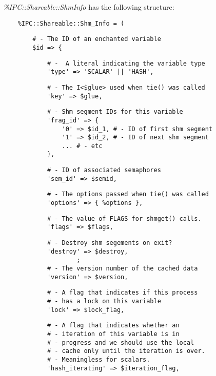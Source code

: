 {\em \%IPC::Shareable::Shm\underscore{}Info\/} has the following structure:
\begin{verbatim}
    %IPC::Shareable::Shm_Info = (
\end{verbatim}
\begin{verbatim}
        # - The ID of an enchanted variable
        $id => {
\end{verbatim}
\begin{verbatim}
            # -  A literal indicating the variable type
            'type' => 'SCALAR' || 'HASH',
\end{verbatim}
\begin{verbatim}
            # - The I<$glue> used when tie() was called
            'key' => $glue,
\end{verbatim}
\begin{verbatim}
            # - Shm segment IDs for this variable
            'frag_id' => {
                '0' => $id_1, # - ID of first shm segment
                '1' => $id_2, # - ID of next shm segment
                ... # - etc
            },
\end{verbatim}
\begin{verbatim}
            # - ID of associated semaphores
            'sem_id' => $semid,
\end{verbatim}
\begin{verbatim}
            # - The options passed when tie() was called
            'options' => { %options },
\end{verbatim}
\begin{verbatim}
            # - The value of FLAGS for shmget() calls.
            'flags' => $flags,
\end{verbatim}
\begin{verbatim}
            # - Destroy shm segements on exit?
            'destroy' => $destroy,
                    ;
            # - The version number of the cached data
            'version' => $version,
\end{verbatim}
\begin{verbatim}
            # - A flag that indicates if this process
            # - has a lock on this variable
            'lock' => $lock_flag,
\end{verbatim}
\begin{verbatim}
            # - A flag that indicates whether an
            # - iteration of this variable is in
            # - progress and we should use the local
            # - cache only until the iteration is over.
            # - Meaningless for scalars.
            'hash_iterating' => $iteration_flag,
\end{verbatim}
